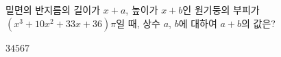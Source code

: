 밑면의 반지름의 길이가 $x+a$, 높이가 $x+b$인 원기둥의 부피가 $(x^3+10x^2+33x+36)\pi$일 때, 상수 $a$, $b$에 대하여 $a+b$의 값은?
\begin{choices32}{$3$}{$4$}{$5$}{$6$}{$7$}\end{choices32}
